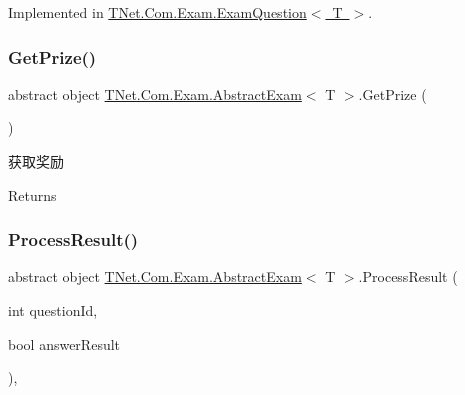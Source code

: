 Implemented in \mbox{\hyperlink{class_t_net_1_1_com_1_1_exam_1_1_exam_question_a52cc7c3b0257b8a9ee5a9e9de4880ef2}{T\+Net.\+Com.\+Exam.\+Exam\+Question$<$ T $>$}}.

\mbox{\label{class_t_net_1_1_com_1_1_exam_1_1_abstract_exam_a51cd6f2f27ff58d597d666a17d73c0fd}} 
\subsubsection{\texorpdfstring{Get\+Prize()}{GetPrize()}}
{\footnotesize\ttfamily abstract object \mbox{\hyperlink{class_t_net_1_1_com_1_1_exam_1_1_abstract_exam}{T\+Net.\+Com.\+Exam.\+Abstract\+Exam}}$<$ T $>$.Get\+Prize (\begin{DoxyParamCaption}{ }\end{DoxyParamCaption})\hspace{0.3cm}{\ttfamily [pure virtual]}}



获取奖励 

\begin{DoxyReturn}{Returns}

\end{DoxyReturn}
\mbox{\label{class_t_net_1_1_com_1_1_exam_1_1_abstract_exam_a3c5fa53128bdf41dc51686e299b52aa4}} 
\subsubsection{\texorpdfstring{Process\+Result()}{ProcessResult()}}
{\footnotesize\ttfamily abstract object \mbox{\hyperlink{class_t_net_1_1_com_1_1_exam_1_1_abstract_exam}{T\+Net.\+Com.\+Exam.\+Abstract\+Exam}}$<$ T $>$.Process\+Result (\begin{DoxyParamCaption}\item[{int}]{question\+Id,  }\item[{bool}]{answer\+Result }\end{DoxyParamCaption})\hspace{0.3cm}{\ttfamily [protected]}, {}}




